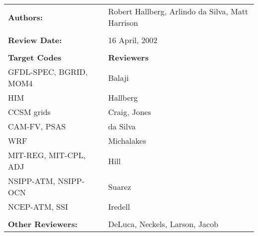 
\begin{tabular}{l l}

{\bf Authors:} & Robert Hallberg, Arlindo da Silva, Matt Harrison \\ \\

{\bf Review Date:}            & 16 April, 2002 \\ \\

{\bf Target Codes}            & {\bf Reviewers} \\
GFDL-SPEC, BGRID, MOM4        & Balaji \\ 
HIM                           & Hallberg \\
CCSM grids                    & Craig, Jones \\
CAM-FV, PSAS                  & da Silva\\
WRF                           & Michalakes \\
MIT-REG, MIT-CPL, ADJ         & Hill \\
NSIPP-ATM, NSIPP-OCN          & Suarez \\
NCEP-ATM, SSI                 & Iredell \\ \\

{\bf Other Reviewers:}        & DeLuca, Neckels, Larson, Jacob

\end{tabular}

